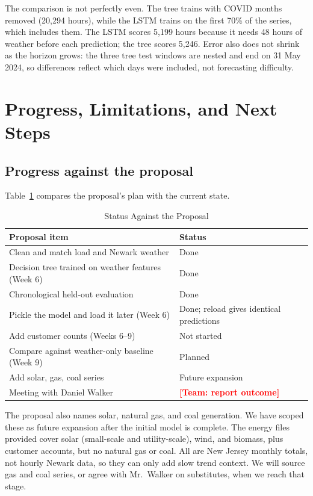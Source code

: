 \documentclass[10pt,letterpaper,twocolumn]{article}
\newcommand{\todo}[1]{\textcolor{red}{\textbf{[Team: #1]}}}
\begin{document}
The comparison is not perfectly even. The tree trains with COVID months removed (20,294 hours), while the LSTM trains on the first 70\% of the series, which includes them. The LSTM scores 5,199 hours because it needs 48 hours of weather before each prediction; the tree scores 5,246. Error also does not shrink as the horizon grows: the three tree test windows are nested and end on 31 May 2024, so differences reflect which days were included, not forecasting difficulty.

\section{Progress, Limitations, and Next Steps}
\subsection{Progress against the proposal}
Table~\ref{tab:status} compares the proposal's plan with the current state.

\begin{table}[t]
\caption{Status Against the Proposal}
\label{tab:status}
\centering\footnotesize
\setlength{\tabcolsep}{3pt}
\begin{tabular}{@{}p{2.05in}p{1.05in}@{}}
\toprule
Proposal item & Status \\
\midrule
Clean and match load and Newark weather & Done \\
Decision tree trained on weather features (Week 6) & Done \\
Chronological held-out evaluation & Done \\
Pickle the model and load it later (Week 6) & Done; reload gives identical predictions \\
Add customer counts (Weeks 6--9) & Not started \\
Compare against weather-only baseline (Week 9) & Planned \\
Add solar, gas, coal series & Future expansion \\
Meeting with Daniel Walker & \todo{report outcome} \\
\bottomrule
\end{tabular}
\end{table}

The proposal also names solar, natural gas, and coal generation. We have scoped these as future expansion after the initial model is complete. The energy files provided cover solar (small-scale and utility-scale), wind, and biomass, plus customer accounts, but no natural gas or coal. All are New Jersey monthly totals, not hourly Newark data, so they can only add slow trend context. We will source gas and coal series, or agree with Mr.\ Walker on substitutes, when we reach that stage.
\end{document}
